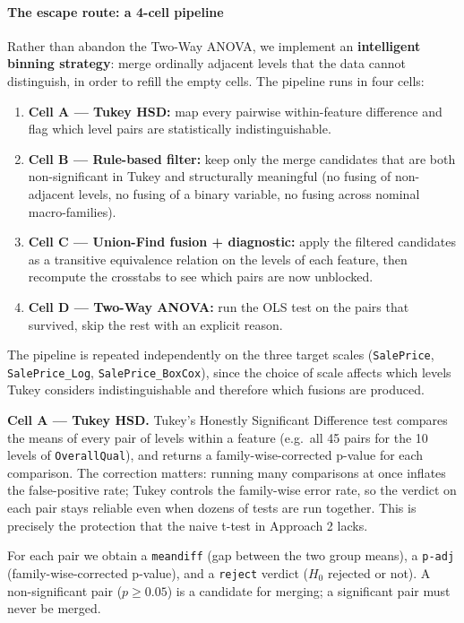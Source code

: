 \paragraph{The escape route: a 4-cell
pipeline}\label{the-escape-route-a-4-cell-pipeline}

Rather than abandon the Two-Way ANOVA, we implement an
\textbf{intelligent binning strategy}: merge ordinally adjacent levels
that the data cannot distinguish, in order to refill the empty cells.
The pipeline runs in four cells:

\begin{enumerate}
\def\labelenumi{\arabic{enumi}.}
\tightlist
\item
  \textbf{Cell A --- Tukey HSD:} map every pairwise within-feature
  difference and flag which level pairs are statistically
  indistinguishable.
\item
  \textbf{Cell B --- Rule-based filter:} keep only the merge candidates
  that are both non-significant in Tukey and structurally meaningful (no
  fusing of non-adjacent levels, no fusing of a binary variable, no
  fusing across nominal macro-families).
\item
  \textbf{Cell C --- Union-Find fusion + diagnostic:} apply the filtered
  candidates as a transitive equivalence relation on the levels of each
  feature, then recompute the crosstabs to see which pairs are now
  unblocked.
\item
  \textbf{Cell D --- Two-Way ANOVA:} run the OLS test on the pairs that
  survived, skip the rest with an explicit reason.
\end{enumerate}

The pipeline is repeated independently on the three target scales
(\texttt{SalePrice}, \texttt{SalePrice\_Log},
\texttt{SalePrice\_BoxCox}), since the choice of scale affects which
levels Tukey considers indistinguishable and therefore which fusions are
produced.

\textbf{Cell A --- Tukey HSD.} Tukey's Honestly Significant Difference
test compares the means of every pair of levels within a feature
(e.g.~all 45 pairs for the 10 levels of \texttt{OverallQual}), and
returns a family-wise-corrected p-value for each comparison. The
correction matters: running many comparisons at once inflates the
false-positive rate; Tukey controls the family-wise error rate, so the
verdict on each pair stays reliable even when dozens of tests are run
together. This is precisely the protection that the naive t-test in
Approach 2 lacks.

For each pair we obtain a \texttt{meandiff} (gap between the two group
means), a \texttt{p-adj} (family-wise-corrected p-value), and a
\texttt{reject} verdict (\(H_0\) rejected or not). A non-significant
pair (\(p \geq 0.05\)) is a candidate for merging; a significant pair
must never be merged.

